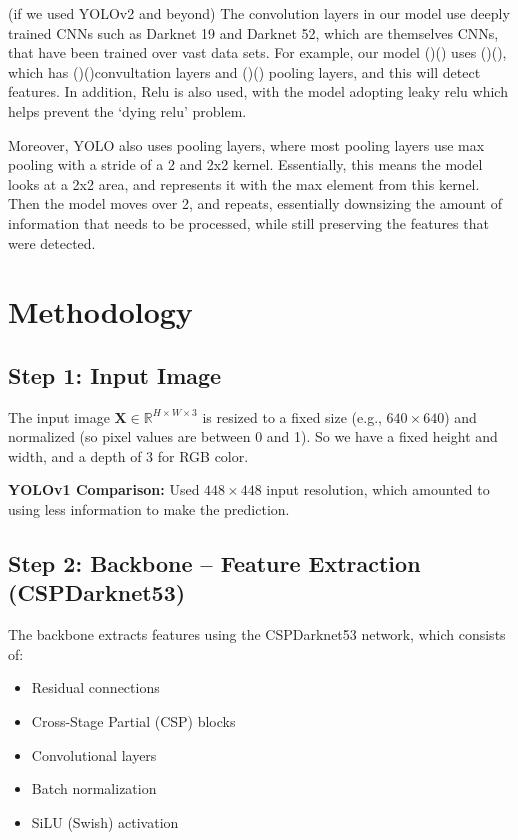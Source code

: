 \documentclass[11pt]{article}
\begin{document}
(if we used YOLOv2 and beyond) The convolution layers in our model use deeply trained CNNs such as Darknet 19 and Darknet 52, which are themselves CNNs, that have been trained over vast data sets. For example, our model ()() uses ()(), which has ()()convultation layers and ()() pooling layers, and this will detect features. In addition, Relu is also used, with the model adopting leaky relu which helps prevent the ‘dying relu’ problem.

Moreover, YOLO also uses pooling layers, where most pooling layers use max pooling with a stride of a 2 and 2x2 kernel. Essentially, this means the model looks at a 2x2 area, and represents it with the max element from this kernel. Then the model moves over 2, and repeats, essentially downsizing the amount of information that needs to be processed, while still preserving the features that were detected.

\section{Methodology}

\subsection{Step 1: Input Image}
The input image $\mathbf{X} \in \mathbb{R}^{H \times W \times 3}$ is resized to a fixed size (e.g., $640 \times 640$) and normalized (so pixel values are between 0 and 1). So we have a fixed height and width, and a depth of 3 for RGB color. \cite{glenn2020yolov5}

\textbf{YOLOv1 Comparison:} Used $448 \times 448$ input resolution, which amounted to using less information to make the prediction. \cite{redmon2016you}

\subsection{Step 2: Backbone – Feature Extraction (CSPDarknet53)}

The backbone extracts features using the CSPDarknet53 network, which consists of:

\begin{itemize}
    \item Residual connections
    \item Cross-Stage Partial (CSP) blocks
    \item Convolutional layers
    \item Batch normalization
    \item SiLU (Swish) activation
\end{itemize}
\end{document}
